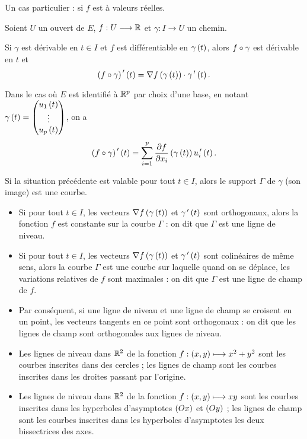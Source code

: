 Un cas particulier : si \(f\) est à valeurs réelles.

\begin{prop}
Soient \(U\) un ouvert de \(E\), \(f:U\longrightarrow\mathbb{R}\) et \(\gamma:I\to U\) un chemin.

Si \(\gamma\) est dérivable en \(t\in I\) et \(f\) est différentiable en \(\gamma\left(t\right)\), alors \(f\circ\gamma\) est dérivable en \(t\) et \[\left(f\circ\gamma\right)^{\,\prime}\left(t\right)=\nabla f\left(\gamma\left(t\right)\right)\cdot\gamma^{\,\prime}\left(t\right).\]
\end{prop}

Dans le cas où \(E\) est identifié à \(\mathbb{R}^p\) par choix d'une base, en notant \(\gamma\left(t\right)=\begin{pmatrix}u_1\left(t\right)\\\vdots\\u_p\left(t\right)\end{pmatrix}\), on a \[\left(f\circ\gamma\right)^{\,\prime}\left(t\right)=\sum_{i=1}^p\pdv{f}{x_i}\left(\gamma\left(t\right)\right)u_i^{\,\prime}\left(t\right).\]

Si la situation précédente est valable pour tout \(t\in I\), alors le support \(\Gamma\) de \(\gamma\) (\ie son image) est une courbe.

\begin{itemize}
    \item Si pour tout \(t\in I\), les vecteurs \(\nabla f\left(\gamma\left(t\right)\right)\) et \(\gamma^{\,\prime}\left(t\right)\) sont orthogonaux, alors la fonction \(f\) est constante sur la courbe \(\Gamma\) : on dit que \(\Gamma\) est une ligne de niveau. \\
    \item Si pour tout \(t\in I\), les vecteurs \(\nabla f\left(\gamma\left(t\right)\right)\) et \(\gamma^{\,\prime}\left(t\right)\) sont colinéaires de même sens, alors la courbe \(\Gamma\) est une courbe sur laquelle quand on se déplace, les variations relatives de \(f\) sont maximales : on dit que \(\Gamma\) est une ligne de champ de \(f\). \\
    \item Par conséquent, si une ligne de niveau et une ligne de champ se croisent en un point, les vecteurs tangents en ce point sont orthogonaux : on dit que les lignes de champ sont orthogonales aux lignes de niveau.
\end{itemize}

\begin{ex}
\begin{itemize}
    \item Les lignes de niveau dans \(\mathbb{R}^2\) de la fonction \(f:\left(x,y\right)\longmapsto x^2+y^2\) sont les courbes inscrites dans des cercles ; les lignes de champ sont les courbes inscrites dans les droites passant par l'origine. \\
    \item Les lignes de niveau dans \(\mathbb{R}^2\) de la fonction \(f:\left(x,y\right)\longmapsto xy\) sont les courbes inscrites dans les hyperboles d'asymptotes \(\left(Ox\right)\) et \(\left(Oy\right)\) ; les lignes de champ sont les courbes inscrites dans les hyperboles d'asymptotes les deux bissectrices des axes.
\end{itemize}
\end{ex}

